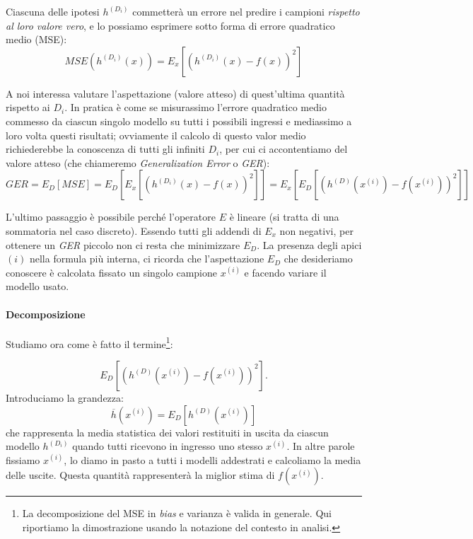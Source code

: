 Ciascuna delle ipotesi $h^{(D_i)}$ commetterà un errore nel predire i campioni \emph{rispetto al loro valore vero}, e lo possiamo esprimere sotto forma di errore quadratico medio (MSE):
\begin{equation*}
MSE\left(h^{(D_i)}(x)\right) =E_x\left[(h^{(D_i)}(x)-f(x))^2\right]
\end{equation*}

A noi interessa valutare l'aspettazione (valore atteso) di quest'ultima quantità rispetto ai $D_i$. In pratica è come se misurassimo l'errore quadratico  medio  commesso da ciascun singolo modello su tutti i possibili ingressi e mediassimo a loro volta questi risultati; ovviamente il calcolo di questo valor medio richiederebbe la conoscenza di tutti gli infiniti $D_i$, per cui ci accontentiamo del valore atteso (che chiameremo \emph{Generalization Error} o \emph{GER}):
\begin{dmath*}
GER = E_D[MSE] = E_D\left[E_x\left[\left(h^{(D_i)}(x)-f(x)\right)^2\right]\right] 
= E_x\left[E_D\left[\left(h^{(D)}(x^{(i)})-f(x^{(i)})\right)^2\right]\right]
\end{dmath*}

L'ultimo passaggio è possibile perché l'operatore $E$ è lineare (si tratta di una sommatoria nel caso discreto). Essendo tutti gli addendi di $E_x$ non negativi, per ottenere un \emph{GER} piccolo non ci resta che minimizzare $E_D$. La presenza degli apici  $(i)$ nella formula più interna, ci ricorda che l'aspettazione $E_D$ che desideriamo conoscere è calcolata fissato un singolo campione $x^{(i)}$ e facendo variare il modello usato.

\paragraph{Decomposizione}
Studiamo ora come è fatto il termine\footnote{La decomposizione del MSE in \emph{bias} e varianza è valida in generale. Qui riportiamo la dimostrazione usando la notazione del contesto in analisi.}:

\begin{equation}\label{eq-aspettazione}
E_D\left[\left(h^{(D)}(x^{(i)})-f(x^{(i)})\right)^2\right].
\end{equation}
Introduciamo la grandezza:
\begin{equation*}
\overline{h}(x^{(i)}) = E_D\left[h^{(D)}(x^{(i)})\right]
\end{equation*}
che rappresenta la media statistica dei valori restituiti in uscita da ciascun modello $h^{(D_i)}$ quando tutti ricevono in ingresso uno stesso $x^{(i)}$. In altre parole fissiamo $x^{(i)}$, lo diamo in pasto a tutti i modelli addestrati e calcoliamo la media delle uscite. Questa quantità rappresenterà la miglior stima di $f(x^{(i)})$.

